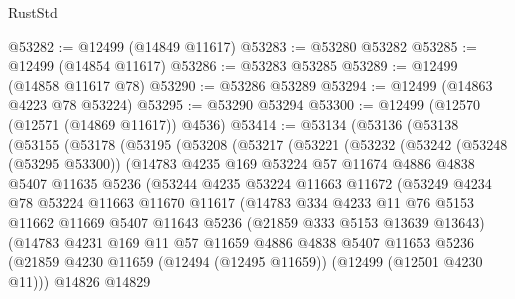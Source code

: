 \begin{lexlean}{RustStd}
\begin{coremodule}
{\begin{coremodule}
{{{{{{{{{{{{{{{{{{{{{{{{{{{{{{{{{{{{{{{{{{{{{{{{{{{{{{{{{{{{{{{{{{{{{{{{{{{{{{{{@53282 := @12499 (@14849 @11617)
@53283 := @53280 @53282
@53285 := @12499 (@14854 @11617)
@53286 := @53283 @53285
@53289 := @12499 (@14858 @11617 @78)
@53290 := @53286 @53289
@53294 := @12499 (@14863 @4223 @78 @53224)
@53295 := @53290 @53294
@53300 := @12499 (@12570 (@12571 (@14869 @11617)) @4536)
@53414 := @53134
    (@53136
      (@53138
        (@53155
          (@53178
            (@53195
              (@53208
                (@53217
                  (@53221
                    (@53232
                      (@53242
                        (@53248 (@53295 @53300))
                        (@14783
                          @4235
                          @169
                          @53224
                          @57
                          @11674
                          @4886
                          @4838
                          @5407
                          @11635
                          @5236
                          (@53244
                            @4235
                            @53224
                            @11663
                            @11672
                            (@53249
                              @4234
                              @78
                              @53224
                              @11663
                              @11670
                              @11617
                              (@14783
                                @334
                                @4233
                                @11
                                @76
                                @5153
                                @11662
                                @11669
                                @5407
                                @11643
                                @5236
                                (@21859 @333 @5153 @13639 @13643)
                                (@14783
                                  @4231
                                  @169
                                  @11
                                  @57
                                  @11659
                                  @4886
                                  @4838
                                  @5407
                                  @11653
                                  @5236
                                  (@21859
                                    @4230
                                    @11659
                                    (@12494 (@12495 @11659))
                                    (@12499 (@12501 @4230 @11)))
                                  @14826
                                  @14829
}}}}}}}}}}}}}}}}}}}}}}}}}}}}}}}}}}}}}}}}}}}}}}}}}}}}}}}}}}}}}}}}}}}}}}}}}}}}}}}}
\end{coremodule}}
\end{coremodule}
\end{lexlean}
